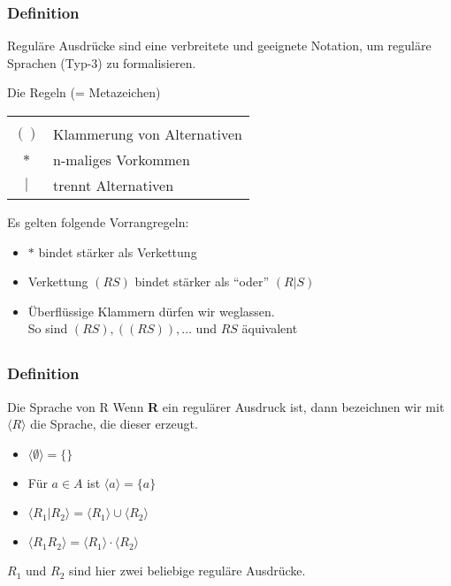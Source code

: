 \begin{frame}
  \frametitle{Definition}

  Reguläre Ausdrücke sind eine verbreitete und geeignete Notation, um reguläre
  Sprachen (Typ-3) zu formalisieren.

	\begin{block}{Die Regeln (= Metazeichen)}
		\begin{tabular}{c p{}}
				\xb{Metazeichen} & 	\xb{Bedeutung} \\
				$( )$			& Klammerung von Alternativen\\
				$*$			& n-maliges Vorkommen\\
				$|$			& trennt Alternativen\\
		\end{tabular}
	\end{block}

  \begin{block}{Es gelten folgende Vorrangregeln:}
   \begin{itemize}
      \item $*$ bindet stärker als Verkettung
      \item Verkettung $(RS)$ bindet stärker als "`oder"' $(R|S)$
      \item Überflüssige Klammern dürfen wir weglassen. \\
      So sind $(RS),((RS)),\ldots$ und $RS$ äquivalent
    \end{itemize}
  \end{block}
\end{frame}


\subsection*{}
\begin{frame}
  \frametitle{Definition}
	\begin{block}{Die Sprache von R}
		Wenn \textbf{R} ein regulärer Ausdruck ist, dann bezeichnen wir mit \textbf{$\langle R \rangle$} die Sprache, die dieser erzeugt.\\
  		\begin{itemize}
    			\item $\langle \emptyset \rangle =\{\}$
			\item Für $a \in A$ ist $\langle a \rangle=\{a\}$
			\item $\langle R_1 | R_2 \rangle = \langle R_1 \rangle \cup \langle R_2 \rangle$
			\item $\langle R_1 R_2 \rangle = \langle R_1 \rangle \cdot \langle R_2 \rangle$
  		\end{itemize}
	$R_1$ und $R_2$ sind hier zwei beliebige reguläre Ausdrücke.


	\end{block}
\end{frame}

